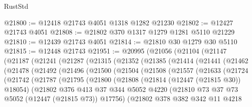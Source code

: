 \begin{lexlean}{RustStd}
\begin{coremodule}
@21800 := @12418 @21743 @4051 @1318 @1282 @21230
@21802 := @12427 @21743 @4051
@21808 := @21802 @370 @1317 @1279 @1281 @5110 @21229
@21810 := @12439 @21743 @4051
@21814 := @21810 @30 @1279 @30 @5110
@21815 := @12448 @21743
@21951 := @20995
    (@21056
      (@21104
        (@21147
          (@21187
            (@21241
              (@21287
                (@21315
                  (@21352
                    (@21385
                      (@21414
                        (@21441
                          (@21462
                            (@21478
                              (@21492
                                (@21496
                                  (@21500
                                    (@21504
                                      (@21508
                                        (@21557
                                          (@21633
                                            (@21724
                                              (@21742
                                                (@21787
                                                  (@21795
                                                    (@21800
                                                      (@21808
                                                        (@21814 (@12447 (@21815 @30)) @18054)
                                                        (@21802
                                                          @376
                                                          @413
                                                          @37
                                                          @344
                                                          @5052
                                                          @4220
                                                          (@21810
                                                            @73
                                                            @37
                                                            @73
                                                            @5052
                                                            (@12447 (@21815 @73))
                                                            @17756)
                                                          (@21802
                                                            @378
                                                            @382
                                                            @342
                                                            @11
                                                            @4218

\end{coremodule}
\end{lexlean}
